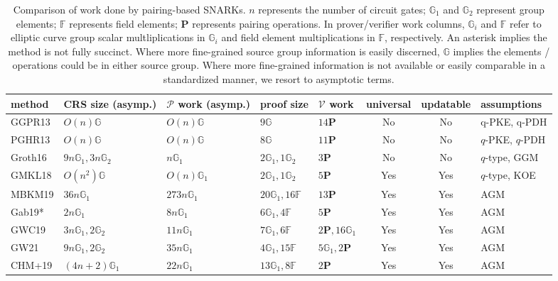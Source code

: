 \begin{table}[!t]
\caption{Comparison of work done by pairing-based SNARKs. 
$n$ represents the number of circuit gates; $\mathbb{G}_1$ and 
$\mathbb{G}_2$ represent group elements; $\mathbb{F}$ represents field elements; $\mathbf{P}$ represents pairing operations. 
In prover/verifier work columns, $\mathbb{G}_i$ and $\mathbb{F}$ refer to elliptic curve group scalar multliplications in $\mathbb{G}_i$ 
and field element multiplications in $\mathbb{F}$, respectively. An asterisk implies the method is not fully succinct. Where more fine-grained 
source group information is easily discerned, $\mathbb{G}$ implies the elements / operations could be in either source group.
Where more fine-grained information is not available or easily comparable in a standardized manner, we resort to asymptotic terms.}
\label{tbl:snark}
\begin{tabular}{|l|l|l|p{3.2cm}|l|c|c|l|}
\hline
\toprule
method & CRS size (asymp.) & $\mathcal{P}$ work (asymp.) & proof size & $\mathcal{V}$ work & universal & updatable & assumptions \\ \hline\toprule
\midrule
GGPR13 & $O(n) \mathbb{G}$ & $O(n) \mathbb{G}$ & $9 \mathbb{G}$ & $14 \mathbf{P}$ & No & No & q-PKE, q-PDH \\ \hline
PGHR13 & $O(n) \mathbb{G}$ & $O(n) \mathbb{G}$ & $8 \mathbb{G}$ & $11 \mathbf{P}$ & No & No & $q$-PKE, $q$-PDH \\ \hline
Groth16 & $9n \mathbb{G}_1, 3n \mathbb{G}_2$ & $n \mathbb{G}_1$ & $2 \mathbb{G}_1, 1 \mathbb{G}_2$ & $3 \mathbf{P}$ & No & No & $q$-type, GGM \\ \hline
GMKL18 & $O(n^2) \mathbb{G}$ & $O(n) \mathbb{G}_1$ & $2 \mathbb{G}_1, 1 \mathbb{G}_2$ & $5 \mathbf{P}$ & Yes & Yes & $q$-type, KOE \\ \hline
MBKM19 & $36n \mathbb{G}_1$ & $273n \mathbb{G}_1$ & $20 \mathbb{G}_1, 16 \mathbb{F}$ & $13 \mathbf{P}$ & Yes & Yes & AGM \\ \hline
Gab19* & $2n \mathbb{G}_1$ & $8n \mathbb{G}_1$ & $6 \mathbb{G}_1, 4 \mathbb{F}$ & $5 \mathbf{P}$ & Yes & Yes & AGM \\ \hline
GWC19 & $3n \mathbb{G}_1, 2 \mathbb{G}_2$ & $11n \mathbb{G}_1$ & $7 \mathbb{G}_1, 6 \mathbb{F}$ & $2 \mathbf{P}, 16 \mathbb{G}_1$ & Yes & Yes & AGM \\ \hline
GW21 & $9n \mathbb{G}_1, 2 \mathbb{G}_2$ & $35n \mathbb{G}_1$ & $4 \mathbb{G}_1, 15 \mathbb{F}$ & $5 \mathbb{G}_1, 2 \mathbf{P}$ & Yes & Yes & AGM \\ \hline
CHM+19 & $(4n +2) \mathbb{G}_1$ & $22n \mathbb{G}_1$ & $13 \mathbb{G}_1, 8 \mathbb{F}$ & $2 \mathbf{P}$ & Yes & Yes & AGM \\ \hline\bottomrule
\bottomrule
\bottomrule
\end{tabular}
\end{table}
